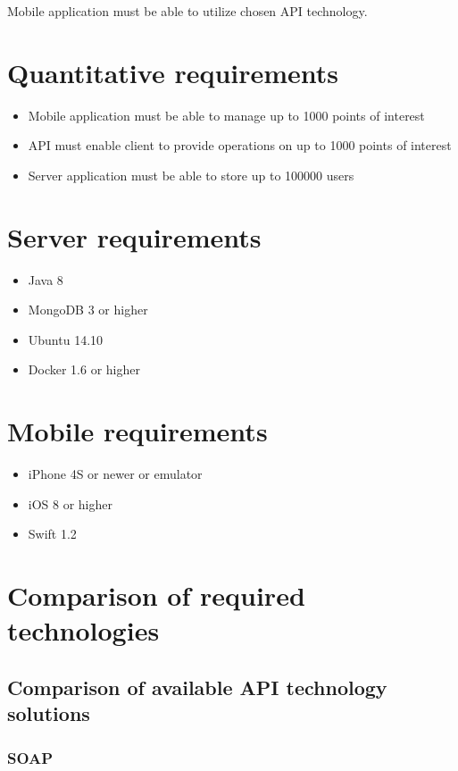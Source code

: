 \documentclass[thesis=M,english]{FITthesis}[2012/10/20]
\begin{document}
Mobile application must be able to utilize chosen API technology.

\section{Quantitative requirements}

\begin{itemize}
  \item Mobile application must be able to manage up to 1000 points of interest
  \item API must enable client to provide operations on up to 1000 points of interest
  \item Server application must be able to store up to 100000 users
\end{itemize}

\section{Server requirements}

\begin{itemize}
	\item Java 8
	\item MongoDB 3 or higher
	\item Ubuntu 14.10 
	\item Docker 1.6 or higher
\end{itemize}

\section{Mobile requirements}

\begin{itemize}
	\item iPhone 4S or newer or emulator
	\item iOS 8 or higher
	\item Swift 1.2 
\end{itemize}


\section{Comparison of required technologies}


\subsection{Comparison of available API technology solutions}

\subsubsection{SOAP}
\end{document}

